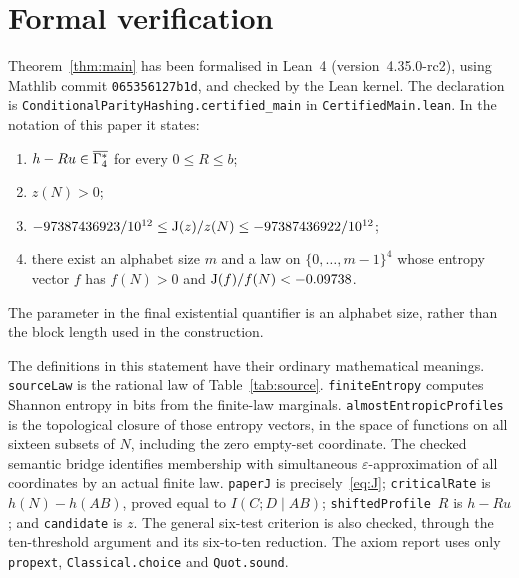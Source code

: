 \section{Formal verification}\label{sec:verification}
Theorem~\ref{thm:main} has been formalised in Lean~4
(version~4.35.0-rc2), using Mathlib commit \texttt{065356127b1d}, and
checked by the Lean kernel. The declaration is
\texttt{ConditionalParityHashing.certified\_main} in
\texttt{CertifiedMain.lean}. In the notation of this paper it states:
\begin{enumerate}[label=(\roman*),leftmargin=*]
\item $h-Ru\in\overline{\Gamma_4^{*}}$ for every $0\le R\le b$;
\item $z(N)>0$;
\item $-97387436923/10^{12}\le\operatorname{J}(z)/z(N)\le-97387436922/10^{12}$;
\item there exist an alphabet size $m$ and a law on $\{0,\ldots,m-1\}^4$
whose entropy vector $f$ has $f(N)>0$ and $\operatorname{J}(f)/f(N)<-0.09738$.
\end{enumerate}
The parameter in the final existential quantifier is an alphabet size,
rather than the block length used in the construction.

The definitions in this statement have their ordinary mathematical
meanings. \texttt{sourceLaw} is the rational law of Table~\ref{tab:source}.
\texttt{finiteEntropy} computes Shannon entropy in bits from the
finite-law marginals. \texttt{almostEntropicProfiles} is the topological
closure of those entropy vectors, in the space of functions on all
sixteen subsets of $N$, including the zero empty-set coordinate.
The checked semantic bridge identifies membership with simultaneous
$\varepsilon$-approximation of all coordinates by an actual finite law.
\texttt{paperJ} is precisely~\eqref{eq:J}; \texttt{criticalRate} is
$h(N)-h(AB)$, proved equal to $I(C;D\mid AB)$; \texttt{shiftedProfile}~$R$
is $h-Ru$; and \texttt{candidate} is $z$.
The general six-test criterion is also checked, through the ten-threshold
argument and its six-to-ten reduction. The axiom report uses only
\texttt{propext}, \texttt{Classical.choice} and \texttt{Quot.sound}.

